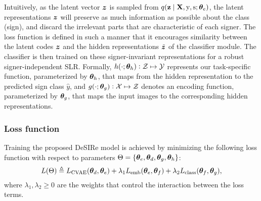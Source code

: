 Intuitively, as the latent vector ${\bm{z}}$ is sampled from $q({\mathbf{z}} \mid {\mathbf{X}}, {\textnormal{y}}, {\textnormal{s}}; {\bm{\theta}}_e)$, the latent representations ${\bm{z}}$ will preserve as much information as possible about the class (sign), and discard the irrelevant parts that are characteristic of each signer. The loss function is defined in such a manner that it encourages similarity between the latent codes ${\bm{z}}$ and the hidden representations $\tilde{{\bm{z}}}$ of the classifier module. The classifier is then trained on these signer-invariant representations for a robust signer-independent SLR. Formally, $h(\cdot; {\bm{\theta}}_h): {\mathcal{Z}} \mapsto {\mathcal{Y}}$ represents our task-specific function, parameterized by ${\bm{\theta}}_h$, that maps from the hidden representation to the predicted sign class $\hat{y}$, and $g(\cdot; {\bm{\theta}}_g): {\mathcal{X}} \mapsto {\mathcal{Z}}$ denotes an encoding function, parameterized by ${\bm{\theta}}_g$, that maps the input images to the corresponding hidden representations.

\subsubsection{Loss function}
\label{sec:desire_loss}
Training the proposed DeSIRe model is achieved by minimizing the following loss function with respect to parameters $\Theta=\{{\bm{\theta}}_{e},{\bm{\theta}}_{d},{\bm{\theta}}_{g},{\bm{\theta}}_{h}\}$:
\begin{equation}
    L(\Theta) \triangleq L_{\text{CVAE}}({\bm{\theta}}_{d},{\bm{\theta}}_{e}) + \lambda_{1} L_{\text{emb}}({\bm{\theta}}_{e},{\bm{\theta}}_{f}) + \lambda_{2} L_{\text{class}}({\bm{\theta}}_{f},{\bm{\theta}}_{g}),
\end{equation}
where $\lambda_{1},\lambda_{2}\geq 0$ are the weights that control the interaction between the loss terms.

